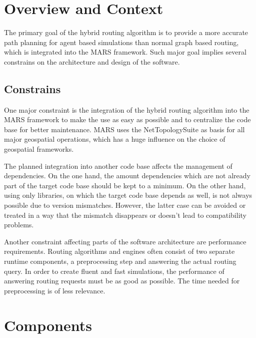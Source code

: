 
\section{Overview and Context}

	The primary goal of the hybrid routing algorithm is to provide a more accurate path planning for agent based simulations than normal graph based routing, which is integrated into the MARS framework.
	Such major goal implies several constrains on the architecture and design of the software.
	
	\subsection{Constrains}
		
		One major constraint is the integration of the hybrid routing algorithm into the MARS framework to make the use as easy as possible and to centralize the code base for better maintenance.
		MARS uses the NetTopologySuite as basis for all major geospatial operations, which has a huge influence on the choice of geospatial frameworks.
		
		The planned integration into another code base affects the management of dependencies.
		On the one hand, the amount dependencies which are not already part of the target code base should be kept to a minimum.
		On the other hand, using only libraries, on which the target code base depends as well, is not always possible due to version mismatches.
		However, the latter case can be avoided or treated in a way that the mismatch disappears or doesn't lead to compatibility problems.
		
		Another constraint affecting parts of the software architecture are performance requirements.
		Routing algorithms and engines often consist of two separate runtime components, a preprocessing step and answering the actual routing query.
		In order to create fluent and fast simulations, the performance of answering routing requests must be as good as possible.
		The time needed for preprocessing is of less relevance.
	
	
\section{Components}

